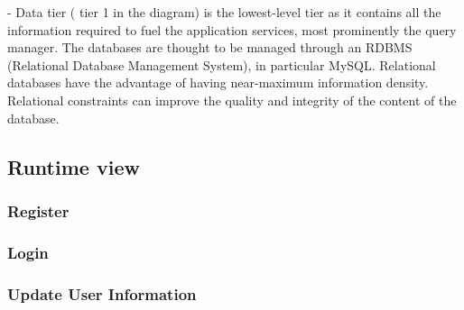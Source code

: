 - Data tier ( tier 1 in the diagram) is the lowest-level tier as it contains all the information required to fuel the
application services, most prominently the query manager. The
databases are thought to be managed through an RDBMS
(Relational Database Management System), in particular MySQL. Relational databases
have the advantage of having near-maximum information density.
Relational constraints can improve the quality and
integrity of the content of the database.

\subsection{Runtime view}

\subsubsection{Register} %
\subsubsection{Login}%
\subsubsection{Update User Information} %

